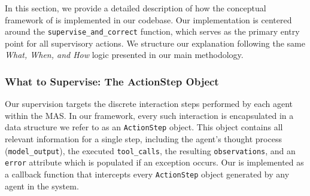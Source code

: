 \begin{table}[t]
    \centering
    \caption{Hyperparameter settings for the Heuristic-Based Adaptive Filter across different benchmarks. The symbols correspond to the definitions in Algorithm \ref{alg:adaptive_filter}.}
    \label{tab:hyperparams}
    \vspace{2mm} %
\end{table}

In this section, we provide a detailed description of how the conceptual framework of \method{} is implemented in our codebase. Our implementation is centered around the \texttt{supervise\_and\_correct} function, which serves as the primary entry point for all supervisory actions. We structure our explanation following the same \emph{What, When, and How} logic presented in our main methodology.

\subsubsection{What to Supervise: The ActionStep Object}
Our supervision targets the discrete interaction steps performed by each agent within the MAS. In our framework, every such interaction is encapsulated in a data structure we refer to as an \texttt{ActionStep} object. This object contains all relevant information for a single step, including the agent's thought process (\texttt{model\_output}), the executed \texttt{tool\_calls}, the resulting \texttt{observations}, and an \texttt{error} attribute which is populated if an exception occurs. Our \method{} is implemented as a callback function that intercepts every \texttt{ActionStep} object generated by any agent in the system.

